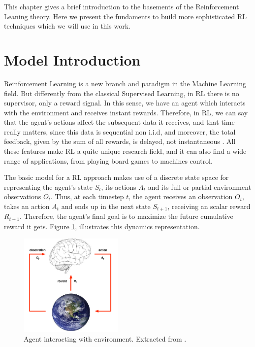 
This chapter gives a brief introduction to the basements of the Reinforcement Leaning theory. Here we present the fundaments to build more sophisticated RL techniques which we will use in this work.

\section{Model Introduction}

Reinforcement Learning is a new branch and paradigm in the Machine Learning field. But differently from the classical Supervised Learning, in RL there is no supervisor, only a reward signal. In this sense, we have an agent which interacts with the environment and receives instant rewards. Therefore, in RL, we can say that the agent's actions affect the subsequent data it receives, and that time really matters, since this data is sequential non i.i.d, and moreover, the total feedback, given by the sum of all rewards, is delayed, not instantaneous \cite{Sutton1998}. All these features make RL a quite unique research field, and it can also find a wide range of applications, from playing board games to machines control.

The basic model for a RL approach makes use of a discrete state space for representing the agent's state $S_t$, its actions $A_t$ and its full or partial environment observations $O_t$. Thus, at each timestep $t$, the agent receives an observation $O_t$, takes an action $A_t$ and ends up in the next state $S_{t+1}$, receiving an scalar reward $R_{t+1}$. Therefore, the agent's final goal is to maximize the future cumulative reward it gets. Figure \ref{fig:RL_basic_model}, illustrates this dynamics representation.

\begin{figure}[H]
    \centering
    \includegraphics[width=0.45\textwidth]{Chapter2/RL_basic_model.png} 
    \caption{Agent interacting with environment. Extracted from \cite{lecture1DS}.}
    \label{fig:RL_basic_model}
\end{figure}


